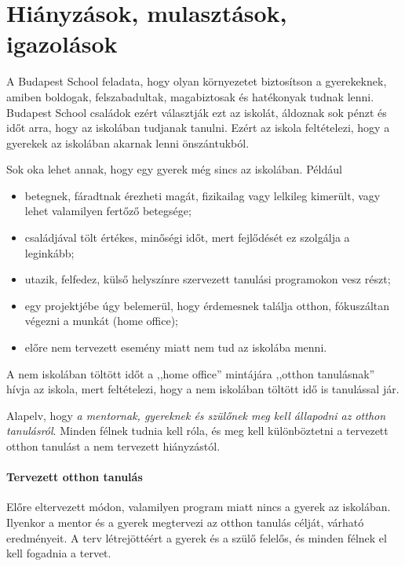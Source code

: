 \section{Hiányzások, mulasztások, igazolások}
A Budapest School feladata, hogy olyan környezetet biztosítson a gyerekeknek, amiben boldogak, felszabadultak, magabiztosak és hatékonyak tudnak lenni. Budapest School családok ezért választják ezt az iskolát, áldoznak sok pénzt és időt arra, hogy az iskolában tudjanak tanulni. Ezért az iskola feltételezi, hogy a gyerekek az iskolában akarnak lenni önszántukból.

Sok oka lehet annak, hogy egy gyerek még sincs az iskolában. Például
\begin{itemize}
    \item betegnek, fáradtnak érezheti magát, fizikailag vagy lelkileg kimerült, vagy lehet valamilyen fertőző betegsége;
    \item családjával tölt értékes, minőségi időt, mert fejlődését ez szolgálja a leginkább;
    \item utazik, felfedez, külső helyszínre szervezett tanulási programokon vesz részt;
    \item egy projektjébe úgy belemerül, hogy érdemesnek találja otthon, fóku\-száltan végezni a munkát (home office);
    \item előre nem tervezett esemény miatt nem tud az iskolába menni.
\end{itemize}

A nem iskolában töltött időt a ,,home office'' mintájára ,,otthon tanulásnak'' hívja az iskola, mert feltételezi, hogy a nem iskolában töltött idő is tanulással jár.

Alapelv, hogy \emph{a mentornak, gyereknek és szülőnek meg kell állapodni az otthon tanulásról}. Minden félnek tudnia kell róla, és meg kell különböztetni a tervezett otthon tanulást a nem tervezett hiányzástól.

\paragraph{Tervezett otthon tanulás} Előre eltervezett módon, valamilyen program miatt nincs a gyerek az iskolában. Ilyenkor a mentor és a gyerek megtervezi az otthon tanulás célját, várható eredményeit. A terv létrejöttéért a gyerek és a szülő felelős, és minden félnek el kell fogadnia a tervet.

